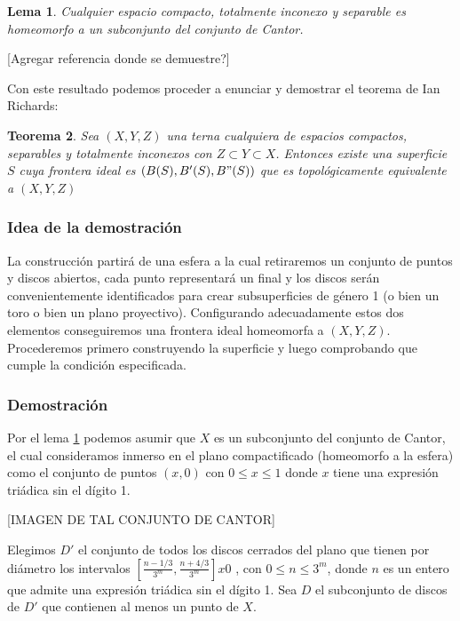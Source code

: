 \documentclass[a4paper,11pt,spanish, twoside, leqno]{tfg-uam}
\newtheorem{teor}{Teorema}[chapter]
\newtheorem{lema}[teor]{Lema}
\theoremstyle{definition}
\begin{document}
\begin{lema}
\label{lema:cantor}
Cualquier espacio compacto, totalmente inconexo y separable es homeomorfo a un subconjunto del conjunto de Cantor.
\end{lema}
[Agregar referencia donde se demuestre?]

Con este resultado podemos proceder a enunciar y demostrar el teorema de Ian Richards:

\begin{teor}
Sea $(X,Y,Z)$ una terna cualquiera de espacios compactos, separables y totalmente inconexos con $Z \subset Y \subset X$.  Entonces existe una superficie $S$ cuya frontera ideal es $(B(S), B'(S), B"(S))$ que es topológicamente equivalente a $(X,Y,Z)$
\end{teor}

\subsubsection*{Idea de la demostración}
La construcción partirá de una esfera a la cual retiraremos un conjunto de puntos y discos abiertos, cada punto representará un final y los discos serán convenientemente identificados para crear  subsuperficies de género 1 (o bien un toro o bien un plano proyectivo). Configurando adecuadamente estos dos elementos conseguiremos una frontera ideal homeomorfa a $(X,Y,Z)$.\\
Procederemos primero construyendo la superficie y luego comprobando que cumple la condición especificada.


\subsubsection*{Demostración}
Por el lema \ref{lema:cantor} podemos asumir que $X$ es un subconjunto del conjunto de Cantor, el cual consideramos inmerso en el plano compactificado (homeomorfo a la esfera) como el conjunto de puntos $(x,0)$ con $0 \leq x\leq 1$ donde $x$ tiene una expresión triádica sin el dígito 1.

[IMAGEN DE TAL CONJUNTO DE CANTOR]

Elegimos $D'$ el conjunto de todos los discos cerrados del plano que tienen por diámetro los intervalos $[\frac{n - 1/3}{3^m} , \frac{n + 4/3}{3^m} ] x {0}$ , con $0\leq n \leq 3^m$, donde $n$ es un entero que admite una expresión triádica sin el dígito 1. Sea $D$ el subconjunto de discos de $D'$ que contienen al menos un punto de $X$.\\
\end{document}
